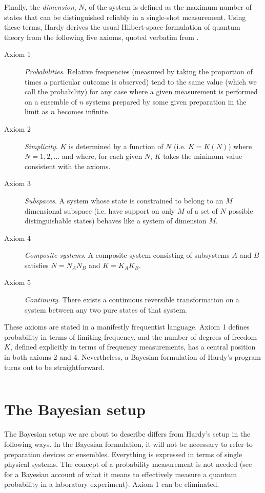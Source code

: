 \documentclass[pra,12pt,tightenlines]{revtex4}
\begin{document}
Finally, the {\it dimension}, $N$, of the system is defined as the maximum
number of states that can be distinguished reliably in a single-shot
measurement. Using these terms, Hardy derives the usual Hilbert-space 
formulation of quantum theory from the following five axioms, quoted verbatim
from \cite{Hardy-0101}.
\begin{description}
\item[Axiom 1] {\it Probabilities}.  Relative frequencies (measured by
taking the proportion of times a particular outcome is observed)
tend to the same value (which we call the probability) for any case
where a given measurement is performed on a ensemble of $n$ systems
prepared by some given preparation in the limit as $n$ becomes infinite.
\item[Axiom 2] {\it Simplicity}. $K$ is determined by a function of
$N$ (i.e. $K=K(N)$) where $N=1,2,\dots$ and where, for each
given $N$, $K$ takes the minimum value consistent with the axioms.
\item[Axiom 3] {\it Subspaces}. A system whose state is constrained to
belong to an $M$
dimensional subspace (i.e. have support on only $M$ of a set of $N$ possible
distinguishable states) behaves like a system of dimension $M$.
\item[Axiom 4]  {\it Composite systems}. A composite system consisting of
subsystems $A$ and $B$ satisfies $N=N_AN_B$ and $K=K_AK_B$.
\item[Axiom 5] {\it Continuity}. There exists a continuous reversible
transformation on a system between any two pure states of that
system.
\end{description}

These axioms are stated in a manifestly frequentist language. Axiom 1 defines
probability in terms of limiting frequency, and the number of degrees of
freedom $K$, 
defined explicitly in terms of frequency measurements, has a central
position in both axioms 2 and 4. Nevertheless, a Bayesian formulation of
Hardy's program turns out to be straightforward.

$\;$ \section{The Bayesian setup}  \label{sec:Bayesian}

The Bayesian setup we are about to describe differs from Hardy's setup in the
following ways. In the Bayesian formulation, it will not be necessary to refer
to preparation devices or ensembles. Everything is expressed in terms of
single physical systems. The concept of a probability measurement is not
needed (see \cite{Caves2002b} for a Bayesian account
of what it means to effectively measure a quantum probability in a laboratory
experiment). Axiom 1 can be eliminated. 
\end{document}
